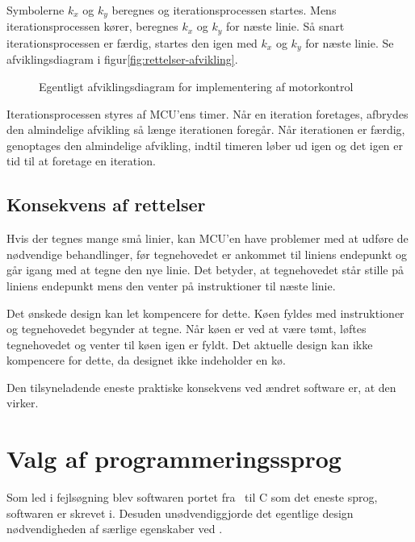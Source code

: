 Symbolerne $k_x$ og $k_y$ beregnes og iterationsprocessen
startes. Mens iterationsprocessen kører, beregnes $k_x$ og $k_y$ for
næste linie. Så snart iterationsprocessen er færdig, startes den igen
med $k_x$ og $k_y$ for næste linie. Se afviklingsdiagram i
figur\vref{fig:rettelser-afvikling}.

\begin{figure}[htbp]
  \centering
  \qquad
  \caption{Egentligt afviklingsdiagram for implementering af
    motorkontrol}
  \label{fig:rettelser-afvikling}
\end{figure}

Iterationsprocessen styres af MCU'ens timer. Når en iteration
foretages, afbrydes den almindelige afvikling så længe iterationen
foregår. Når iterationen er færdig, genoptages den almindelige
afvikling, indtil timeren løber ud igen og det igen er tid til at
foretage en iteration.


\subsection{Konsekvens af rettelser}

Hvis der tegnes mange små linier, kan MCU'en have problemer med at
udføre de nødvendige behandlinger, før tegnehovedet er ankommet til
liniens endepunkt og går igang med at tegne den nye linie. Det
betyder, at tegnehovedet står stille på liniens endepunkt mens den
venter på instruktioner til næste linie.

Det ønskede design kan let kompencere for dette. Køen fyldes med
instruktioner og tegnehovedet begynder at tegne. Når køen er ved at
være tømt, løftes tegnehovedet og venter til køen igen er fyldt. Det
aktuelle design kan ikke kompencere for dette, da designet ikke
indeholder en kø.

Den tilsyneladende eneste praktiske konsekvens ved ændret software er,
at den virker.


\section{Valg af programmeringssprog}
\label{sec:bilag-programmeringssprog}

Som led i fejlsøgning blev softwaren portet fra \Cpp\ til C som det
eneste sprog, softwaren er skrevet i. Desuden unødvendiggjorde det
egentlige design nødvendigheden af særlige egenskaber ved \Cpp .


